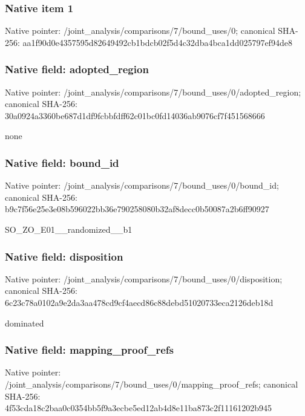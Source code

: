 \documentclass[10pt,a4paper]{article}
\begin{document}
\subsubsection{Native item 1}
Native pointer: /joint\_\allowbreak{}analysis/comparisons/7/bound\_\allowbreak{}uses/0; canonical SHA-256: aa1f90d0e4357595d82649492cb1bdcb02f5d4c32dba4bca1dd025797ef94de8

\subsubsection{Native field: adopted\_\allowbreak{}region}
Native pointer: /joint\_\allowbreak{}analysis/comparisons/7/bound\_\allowbreak{}uses/0/adopted\_\allowbreak{}region; canonical SHA-256: 30a0924a3360be687d1df9fcbbfdff62c01bc0fd14036ab9076cf7f451568666

\begingroup\raggedright\sloppy none\par\endgroup

\subsubsection{Native field: bound\_\allowbreak{}id}
Native pointer: /joint\_\allowbreak{}analysis/comparisons/7/bound\_\allowbreak{}uses/0/bound\_\allowbreak{}id; canonical SHA-256: b9c7f56e25e3e08b596022bb36e790258080b32af8decc0b50087a2b6ff90927

\begingroup\raggedright\sloppy SO\_\allowbreak{}ZO\_\allowbreak{}E01\_\allowbreak{}\_\allowbreak{}randomized\_\allowbreak{}\_\allowbreak{}b1\par\endgroup

\subsubsection{Native field: disposition}
Native pointer: /joint\_\allowbreak{}analysis/comparisons/7/bound\_\allowbreak{}uses/0/disposition; canonical SHA-256: 6c23c78a0102a9e2da3aa478cd9cf4aecd86c88debd51020733eca2126deb18d

\begingroup\raggedright\sloppy dominated\par\endgroup

\subsubsection{Native field: mapping\_\allowbreak{}proof\_\allowbreak{}refs}
Native pointer: /joint\_\allowbreak{}analysis/comparisons/7/bound\_\allowbreak{}uses/0/mapping\_\allowbreak{}proof\_\allowbreak{}refs; canonical SHA-256: 4f53cda18c2baa0c0354bb5f9a3ecbe5ed12ab4d8e11ba873c2f11161202b945
\end{document}
